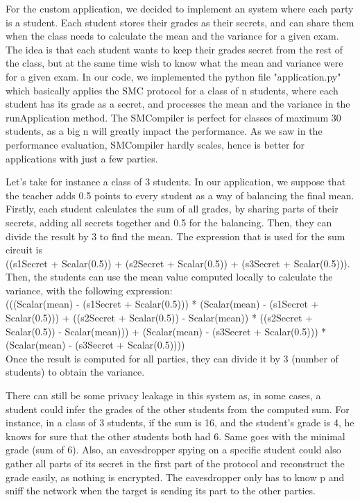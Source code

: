 \documentclass[10pt,conference,compsocconf]{IEEEtran}
\begin{document}
For the custom application, we decided to implement an system where each party is a student. Each student stores their grades as their secrets, and can share them when the class needs to calculate the mean and the variance for a given exam. The idea is that each student wants to keep their grades secret from the rest of the class, but at the same time wish to know what the mean and variance were for a given exam.
In our code, we implemented the python file "application.py" which basically applies the SMC protocol for a class of n students, where each student has its grade as a secret, and processes the mean and the variance in the runApplication method. The SMCompiler is perfect for classes of maximum 30 students, as a big n will greatly impact the performance. As we saw in the performance evaluation, SMCompiler hardly scales, hence is better for applications with just a few parties.

Let's take for instance a class of 3 students. In our application, we suppose that the teacher adds 0.5 points to every student as a way of balancing the final mean.
Firstly, each student calculates the sum of all grades, by sharing parts of their secrets, adding all secrets together and 0.5 for the balancing. Then, they can divide the result by 3 to find the mean. 
The expression that is used for the sum circuit is \\ ((s1Secret + Scalar(0.5)) + (s2Secret + Scalar(0.5)) + (s3Secret + Scalar(0.5))). \\
Then, the students can use the mean value computed locally to calculate the variance, with the following expression: \\
(((Scalar(mean) - (s1Secret + Scalar(0.5))) * (Scalar(mean) - (s1Secret + Scalar(0.5)))
        + ((s2Secret + Scalar(0.5)) - Scalar(mean)) * ((s2Secret + Scalar(0.5)) - Scalar(mean)))
        + (Scalar(mean) - (s3Secret + Scalar(0.5))) * (Scalar(mean) - (s3Secret + Scalar(0.5)))) \\
Once the result is computed for all parties, they can divide it by 3 (number of students) to obtain the variance.

There can still be some privacy leakage in this system as, in some cases, a student could infer the grades of the other students from the computed sum. For instance, in a class of 3 students, if the sum is 16, and the student's grade is 4, he knows for sure that the other students both had 6. Same goes with the minimal grade (sum of 6). Also, an eavesdropper spying on a specific student could also gather all parts of its secret in the first part of the protocol and reconstruct the grade easily, as nothing is encrypted. The eavesdropper only has to know p and sniff the network when the target is sending its part to the other parties.



\end{document}
